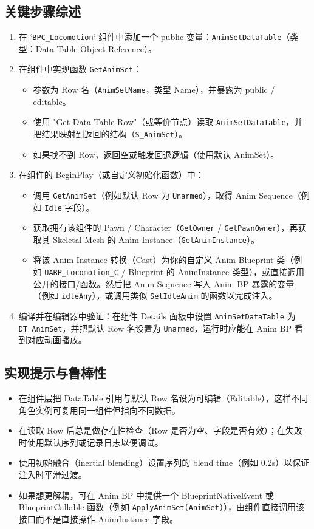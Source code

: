 \documentclass[10pt,CJKmath]{zhbook-v1}
\newcommand{\il}[1]{\texttt{#1}}%
\begin{document}
\subsection{关键步骤综述}
\begin{enumerate}
  \item 在 `\il{BPC_Locomotion}` 组件中添加一个 public 变量：\il{AnimSetDataTable}（类型：Data Table Object Reference）。
  \item 在组件中实现函数 \il{GetAnimSet}：
    \begin{itemize}
      \item 参数为 Row 名（\il{AnimSetName}，类型 Name），并暴露为 public / editable。
      \item 使用 "Get Data Table Row"（或等价节点）读取 \il{AnimSetDataTable}，并把结果映射到返回的结构（\il{S_AnimSet}）。
      \item 如果找不到 Row，返回空或触发回退逻辑（使用默认 AnimSet）。
    \end{itemize}
  \item 在组件的 BeginPlay（或自定义初始化函数）中：
    \begin{itemize}
      \item 调用 \il{GetAnimSet}（例如默认 Row 为 \il{Unarmed}），取得 Anim Sequence（例如 \il{Idle} 字段）。
      \item 获取拥有该组件的 Pawn / Character（\il{GetOwner} / \il{GetPawnOwner}），再获取其 Skeletal Mesh 的 Anim Instance（\il{GetAnimInstance}）。
      \item 将该 Anim Instance 转换（Cast）为你的自定义 Anim Blueprint 类（例如 \il{UABP_Locomotion_C} / Blueprint 的 AnimInstance 类型），或直接调用公开的接口/函数。然后把 Anim Sequence 写入 Anim BP 暴露的变量（例如 \il{idleAny}），或调用类似 \il{SetIdleAnim} 的函数以完成注入。
    \end{itemize}
  \item 编译并在编辑器中验证：在组件 Details 面板中设置 \il{AnimSetDataTable} 为 \il{DT_AnimSet}，并把默认 Row 名设置为 \il{Unarmed}，运行时应能在 Anim BP 看到对应动画播放。
\end{enumerate}

\subsection{实现提示与鲁棒性}
\begin{itemize}
  \item 在组件层把 DataTable 引用与默认 Row 名设为可编辑（Editable），这样不同角色实例可复用同一组件但指向不同数据。
  \item 在读取 Row 后总是做存在性检查（Row 是否为空、字段是否有效）；在失败时使用默认序列或记录日志以便调试。
  \item 使用初始融合（inertial blending）设置序列的 blend time（例如 0.2s）以保证注入时平滑过渡。
  \item 如果想更解耦，可在 Anim BP 中提供一个 BlueprintNativeEvent 或 BlueprintCallable 函数（例如 \il{ApplyAnimSet(AnimSet)}），由组件直接调用该接口而不是直接操作 AnimInstance 字段。
\end{itemize}
\end{document}
